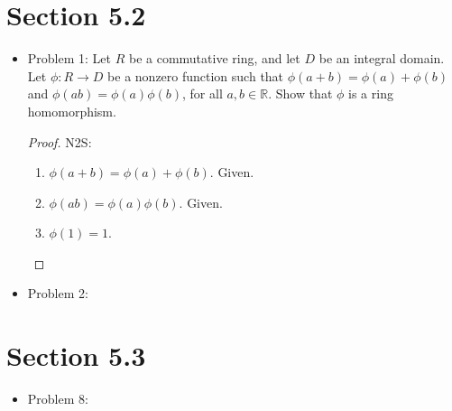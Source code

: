 \documentclass[hidelinks,12pt]{article}
\title{\scalebox{2}{Math 531 Homework 9}}
\author{\scalebox{1.5}{Theo Koss}}
\date{April 2021}
\newcommand{\R}{\mathbb{R}}
\begin{document}
\maketitle
\section{Section 5.2}
\begin{itemize}
\item Problem 1: Let $R$ be a commutative ring, and let $D$ be an integral domain. Let $\phi:R\to D$ be a nonzero function such that $\phi(a+b)=\phi(a)+\phi(b)$ and $\phi(ab)=\phi(a)\phi(b)$, for all $a,b\in\R$. Show that $\phi$ is a ring homomorphism.\begin{proof}N2S:\begin{enumerate}
    \item $\phi(a+b)=\phi(a)+\phi(b)$. Given.
    \item $\phi(ab)=\phi(a)\phi(b)$. Given.
    \item $\phi(1)=1$.
\end{enumerate}
\end{proof}
\item Problem 2:
\end{itemize}
\section{Section 5.3}
\begin{itemize}
    \item Problem 8:
\end{itemize}
\end{document}
